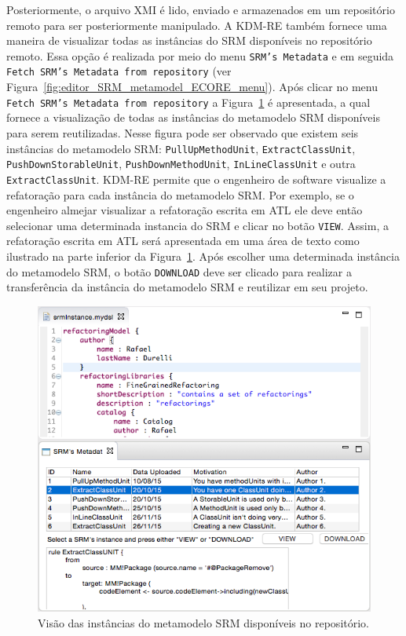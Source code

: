 Posteriormente, o arquivo XMI é lido, enviado e armazenados em um repositório remoto para ser posteriormente manipulado. A KDM-RE também fornece uma maneira de visualizar todas as instâncias do SRM disponíveis no repositório remoto. Essa opção é realizada por meio do menu \texttt{SRM's Metadata} e em seguida \texttt{Fetch SRM's Metadata from repository} (ver Figura~\ref{fig:editor_SRM_metamodel_ECORE_menu}). Após clicar no menu \texttt{Fetch SRM's Metadata from repository} a Figura~\ref{fig:download_kDM_re_repository} é apresentada, a qual fornece a visualização de todas as instâncias do metamodelo SRM disponíveis para serem reutilizadas. Nesse figura pode ser observado que existem seis instâncias do metamodelo SRM: \texttt{PullUpMethodUnit}, \texttt{ExtractClassUnit}, \texttt{PushDownStorableUnit}, \texttt{PushDownMethodUnit}, \texttt{InLineClassUnit} e outra \texttt{ExtractClassUnit}. KDM-RE permite que o engenheiro de software visualize a refatoração para cada instância do metamodelo SRM. Por exemplo, se o engenheiro almejar visualizar a refatoração escrita em ATL ele deve então selecionar uma determinada instancia do SRM e clicar no botão \texttt{VIEW}. Assim, a refatoração escrita em ATL será apresentada em uma área de texto como ilustrado na parte inferior da Figura~\ref{fig:download_kDM_re_repository}. Após escolher uma determinada instância do metamodelo SRM, o botão \texttt{DOWNLOAD} deve ser clicado para realizar a transferência da instância do metamodelo SRM e reutilizar em seu projeto. 

\begin{figure}[!h]
	\centering
	\caption{Visão das instâncias do metamodelo SRM disponíveis no repositório.}
	\label{fig:download_kDM_re_repository}
	\includegraphics[scale=0.7]{images/DOWNLOAD_KDM_RE}
	\fautor
\end{figure}


